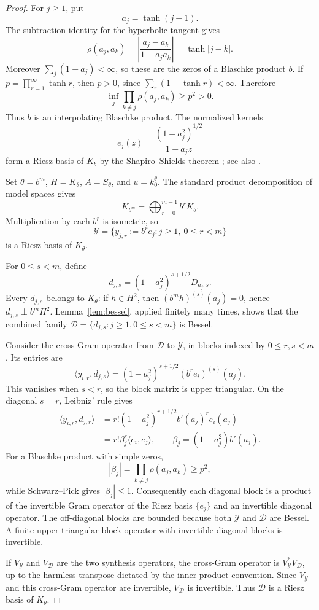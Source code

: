 \documentclass[11pt]{article}
\theoremstyle{remark}
\newcommand{\rhoh}{\rho}
\begin{document}
\begin{proof}
For \(j\ge1\), put
\[
 a_j=\tanh(j+1).
\]
The subtraction identity for the hyperbolic tangent gives
\[
 \rhoh(a_j,a_k)=\left|\frac{a_j-a_k}{1-a_ja_k}\right|
 =\tanh|j-k|.
\]
Moreover \(\sum_j(1-a_j)<\infty\), so these are the zeros of a Blaschke
product \(b\). If
\(p=\prod_{r=1}^{\infty}\tanh r\), then \(p>0\), since
\(\sum_r(1-\tanh r)<\infty\). Therefore
\[
 \inf_j\prod_{k\ne j}\rhoh(a_j,a_k)\ge p^2>0.
\]
Thus \(b\) is an interpolating Blaschke product. The normalized kernels
\[
 e_j(z)=\frac{(1-a_j^2)^{1/2}}{1-a_jz}
\]
form a Riesz basis of \(K_b\) by the Shapiro--Shields theorem
\cite{ShapiroShields}; see also \cite{GMR}.

Set \(\theta=b^m\), \(H=K_\theta\), \(A=S_\theta\), and
\(u=k_0^\theta\). The standard product decomposition of model spaces gives
\[
 K_{b^m}=\bigoplus_{r=0}^{m-1}b^rK_b.
\]
Multiplication by each \(b^r\) is isometric, so
\[
 \mathcal Y=\{y_{j,r}:=b^r e_j:j\ge1,\ 0\le r<m\}
\]
is a Riesz basis of \(K_\theta\).

For \(0\le s<m\), define
\[
 d_{j,s}=(1-a_j^2)^{s+1/2}D_{a_j,s}.
\]
Every \(d_{j,s}\) belongs to \(K_\theta\): if \(h\in H^2\), then
\((b^mh)^{(s)}(a_j)=0\), hence \(d_{j,s}\perp b^mH^2\).
Lemma~\ref{lem:bessel}, applied finitely many times, shows that the combined
family
\(\mathcal D=\{d_{j,s}:j\ge1,0\le s<m\}\) is Bessel.

Consider the cross-Gram operator from \(\mathcal D\) to \(\mathcal Y\), in
blocks indexed by \(0\le r,s<m\). Its entries are
\[
 \langle y_{i,r},d_{j,s}\rangle
 =(1-a_j^2)^{s+1/2}(b^re_i)^{(s)}(a_j).
\]
This vanishes when \(s<r\), so the block matrix is upper triangular. On the
diagonal \(s=r\), Leibniz' rule gives
\begin{align*}
 \langle y_{i,r},d_{j,r}\rangle
 &=r!(1-a_j^2)^{r+1/2}b'(a_j)^r e_i(a_j)\\
 &=r!\beta_j^r\langle e_i,e_j\rangle,
 \qquad \beta_j=(1-a_j^2)b'(a_j).
\end{align*}
For a Blaschke product with simple zeros,
\[
 |\beta_j|=\prod_{k\ne j}\rhoh(a_j,a_k)\ge p^2,
\]
while Schwarz--Pick gives \(|\beta_j|\le1\). Consequently each diagonal
block is a product of the invertible Gram operator of the Riesz basis
\(\{e_j\}\) and an invertible diagonal operator. The off-diagonal blocks are
bounded because both \(\mathcal Y\) and \(\mathcal D\) are Bessel. A finite
upper-triangular block operator with invertible diagonal blocks is invertible.

If \(V_{\mathcal Y}\) and \(V_{\mathcal D}\) are the two synthesis operators,
the cross-Gram operator is \(V_{\mathcal Y}^*V_{\mathcal D}\), up to the
harmless transpose dictated by the inner-product convention. Since
\(V_{\mathcal Y}\) and this cross-Gram operator are invertible,
\(V_{\mathcal D}\) is invertible. Thus \(\mathcal D\) is a Riesz basis of
\(K_\theta\).


\end{proof}
\end{document}

